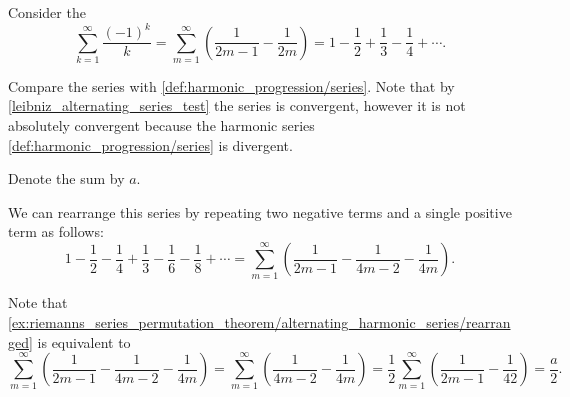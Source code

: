 \begin{example}\label{ex:riemanns_series_permutation_theorem/alternating_harmonic_series}\cite[]{Фихтенгольц1968/2}
  Consider the 
  \begin{equation}\label{ex:riemanns_series_permutation_theorem/alternating_harmonic_series/series}
    \sum_{k=1}^\infty \frac {(-1)^k} k
    =
    \sum_{m=1}^\infty \left( \frac 1 {2m - 1} - \frac 1 {2m} \right)
    =
    1 - \frac 1 2 + \frac 1 3 - \frac 1 4 + \cdots.
  \end{equation}

  Compare the series with \cref{def:harmonic_progression/series}. Note that by \cref{leibniz_alternating_series_test} the series is convergent, however it is not absolutely convergent because the harmonic series \cref{def:harmonic_progression/series} is divergent.

  Denote the sum by \( a \).

  We can rearrange this series by repeating two negative terms and a single positive term as follows:
  \begin{equation}\label{ex:riemanns_series_permutation_theorem/alternating_harmonic_series/rearranged}
    1 - \frac 1 2 - \frac 1 4 + \frac 1 3 - \frac 1 6 - \frac 1 8 + \cdots
    =
    \sum_{m=1}^\infty \left( \frac 1 {2m - 1} - \frac 1 {4m - 2} - \frac 1 {4m} \right).
  \end{equation}

  Note that \cref{ex:riemanns_series_permutation_theorem/alternating_harmonic_series/rearranged} is equivalent to
  \begin{equation*}
    \sum_{m=1}^\infty \left( \frac 1 {2m - 1} - \frac 1 {4m - 2} - \frac 1 {4m} \right)
    =
    \sum_{m=1}^\infty \left( \frac 1 {4m - 2} - \frac 1 {4m} \right)
    =
    \frac 1 2 \sum_{m=1}^\infty \left( \frac 1 {2m - 1} - \frac 1 {42} \right)
    =
    \frac a 2.
  \end{equation*}
\end{example}


